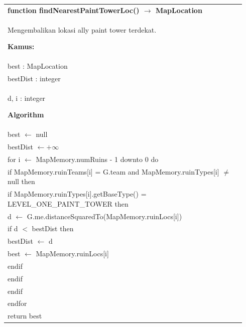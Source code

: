 \documentclass{article}
\newenvironment{pseudobox}
{
\centering
\begin{longtable}{|p{0.94\linewidth}|}
\hline
}
{
\\ \hline
\end{longtable}
\vspace{0.05cm}
}
\begin{document}
\begin{pseudobox}
\textbf{function findNearestPaintTowerLoc() $\rightarrow$ MapLocation} \\
{ Mengembalikan lokasi ally paint tower terdekat. }

\textbf{Kamus:} \\
\hspace*{1em} best : MapLocation \\
\hspace*{1em} bestDist : integer \\
\hspace*{1em} d, i : integer

\textbf{Algorithm} \\
\hspace*{1em} best $\leftarrow$ null \\
\hspace*{1em} bestDist $\leftarrow +\infty$ \\

\hspace*{1em} for i $\leftarrow$ MapMemory.numRuins - 1 downto 0 do \\
\hspace*{2em} if MapMemory.ruinTeams[i] = G.team and MapMemory.ruinTypes[i] $\neq$ null then \\
\hspace*{3em} if MapMemory.ruinTypes[i].getBaseType() = LEVEL\_ONE\_PAINT\_TOWER then \\
\hspace*{4em} d $\leftarrow$ G.me.distanceSquaredTo(MapMemory.ruinLocs[i]) \\
\hspace*{4em} if d $<$ bestDist then \\
\hspace*{5em} bestDist $\leftarrow$ d \\
\hspace*{5em} best $\leftarrow$ MapMemory.ruinLocs[i] \\
\hspace*{4em} endif \\
\hspace*{3em} endif \\
\hspace*{2em} endif \\
\hspace*{1em} endfor \\

\hspace*{1em} return best
\end{pseudobox}
\end{document}
